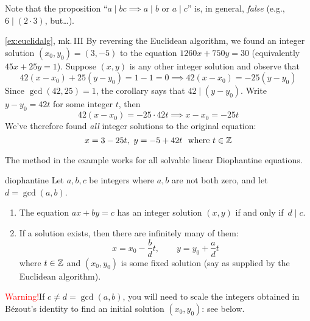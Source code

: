 Note that the proposition ``$a\mid bc\implies a\mid b$ or $a\mid c$'' is, in general, \emph{false} (e.g., $6\mid(2\cdot 3)$, but\ldots).


\begin{example*}{\ref{ex:euclidalg}, mk.\,III}{}
	By reversing the Euclidean algorithm, we found an integer solution $(x_0,y_0)=(3,-5)$ to the equation $1260x+750y=30$ (equivalently $45x+25y=1$). Suppose $(x,y)$ is any other integer solution and observe that
	\[
		42(x-x_0)+25(y-y_0)=1-1=0 \implies 42(x-x_0)=-25(y-y_0)
	\]
	Since $\gcd(42,25)=1$, the corollary says that $42\mid(y-y_0)$. Write $y-y_0=42t$ for some integer $t$, then
	\[
		42(x-x_0)=-25\cdot 42t\implies x-x_0=-25t
	\]
	We've therefore found \emph{all} integer solutions to the original equation:
	\[
		x=3-25t,\ y=-5+42t\ \text{ where }t\in\mathbb{Z}
	\]
\end{example*}

\goodbreak

The method in the example works for all solvable linear Diophantine equations.

\begin{thm}{}{diophantine}
	Let $a,b,c$ be integers where $a,b$ are not both zero, and let $d=\gcd(a,b)$.
	\begin{enumerate}\itemsep0pt
	  \item The equation $ax+by=c$ has an integer solution $(x,y)$ if and only if $\,d\mid c$.
	  \item If a solution exists, then there are infinitely many of them:%
		\[
			x=x_0-\frac bd t,\qquad y=y_0+\frac ad t\tag{$\ast$}
		\]
		where $t\in\mathbb{Z}$ and $(x_0,y_0)$ is some fixed solution (say as supplied by the Euclidean algorithm).
	\end{enumerate} 
\end{thm}




\textcolor{red}{Warning!}\lstsp If $c\neq d=\gcd(a,b)$, you will need to scale the integers obtained in Bézout's identity to find an initial solution $(x_0,y_0)$: see below.

